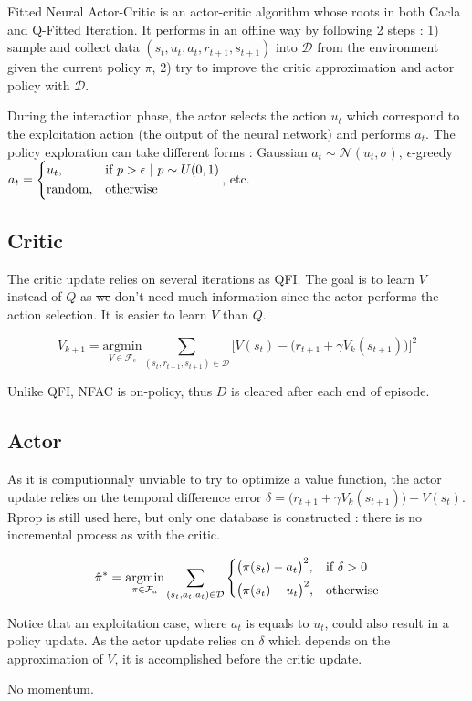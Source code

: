 Fitted Neural Actor-Critic is an actor-critic algorithm whose roots in both Cacla and Q-Fitted Iteration.
It performs in an offline way by following 2 steps : 1) sample and collect data $(s_t, u_t, a_t, r_{t+1}, s_{t+1})$ into $\mathcal{D}$
from the environment given the current policy $\pi$, 2) try to improve the critic approximation and actor policy with $\mathcal{D}$.

During the interaction phase, the actor selects the action $u_t$ which correspond to the exploitation action (the output of the neural network)
and performs $a_t$. The policy exploration can take different forms : Gaussian $a_t \sim \mathcal{N}(u_t, \sigma)$, 
$\epsilon$-greedy 
$a_t = 
\begin{dcases} u_t, & \text{if }p > \epsilon\ |\ p \sim U(0,1) \\
      \text{random}, & \text{otherwise}
\end{dcases}$, etc.

\subsection{Critic}

The critic update relies on several iterations as QFI. The goal is to learn $V$ instead
of $Q$ as \sout{we} don't need much information since the actor performs the action selection.
It is easier to learn $V$ than $Q$.


\begin{equation}
 V_{k+1} = \underset{V \in \mathcal{F}_c}{\text{argmin}} 
 \sum_{ (s_t, r_{t+1}, s_{t+1}) \in \mathcal{D}}
 \Big[ V(s_t) - \big( r_{t+1} + \gamma V_k(s_{t+1}) \big) \Big]^2
\end{equation}

Unlike QFI, NFAC is on-policy, thus $D$ is cleared after each end of episode.

\subsection{Actor}

As it is computionnaly unviable to try to optimize a value function, the actor update
relies on the temporal difference error $\delta = \big( r_{t+1} + \gamma V_k(s_{t+1}) \big) - V(s_t)$.
Rprop is still used here, but only one database is constructed : there is no incremental process
as with the critic.

\begin{equation}
 \hat{\pi}^* = \underset{\pi \in \mathcal{F}_a}{\text{argmin}} 
 \sum_{ (s_t,a_t, a_t) \in \mathcal{D}}
 \begin{dcases}
  \big( \pi(s_t) - a_t \big)^2 ,& \text{if } \delta > 0\\
  \big( \pi(s_t) - u_t \big)^2 ,& \text{otherwise}
 \end{dcases}
\end{equation}

Notice that an exploitation case, where $a_t$ is equals to $u_t$, could also
result in a policy update.
As the actor update relies on $\delta$ which depends on the approximation of $V$,
it is accomplished before the critic update.

No momentum.
